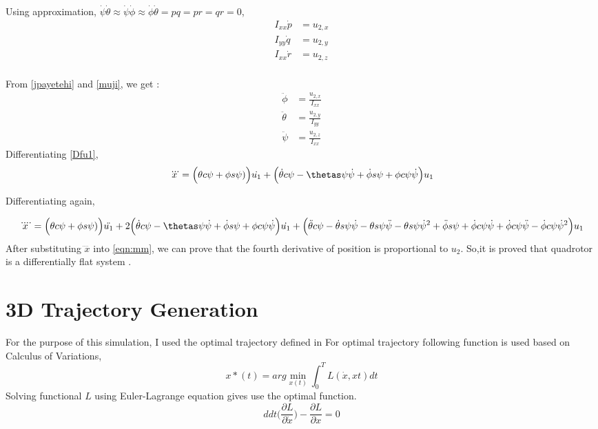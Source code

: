 \documentclass[conference,onecolumn,10pt]{IEEEtran}
\begin{document}
Using approximation, $\dot{\psi} \dot{\theta} \approx \dot{\psi}\dot{\phi} \approx \dot{\phi} \dot{\theta} = pq = pr = qr = 0   $,
\begin{equation}
\label{eqn:mm}
\begin{aligned}
I_{xx}\dot{p} & = u_{2,x}  \\ 
I_{yy}\dot{q} & = u_{2,y}  \\
I_{xx}\dot{r} & = u_{2,z} \\
\end{aligned}
\end{equation}

From \eqref{jpayetehi} and \eqref{muji}, we get : 
\begin{equation}
\label{muji}
\begin{aligned}
\ddot{\phi} & = \frac{u_{2,x}}{I_{xx}} \\ 
\ddot{\theta} &= \frac{u_{2,y}}{I_{yy}}  \\
\ddot{\psi} & = \frac{u_{2,z}}{ I_{xx}}
\end{aligned}
\end{equation}
Differentiating \eqref{Dfu1}, 
\begin{equation}
\label{lamo}
\dddot{x} = \Big(\theta c \psi + \phi s \psi)\Big)\dot{u_1}+ \Big(\dot{\theta} c \psi -\thetas\psi \dot{\psi} + \dot{\phi} s \psi + \phi c \psi \dot{\psi}\Big){u_1}
\end{equation}

Differentiating again,

 \begin{equation}
\label{lamo}
\ddddot{x} = \Big(\theta c \psi + \phi s \psi)\Big)\ddot{u_1}+ 2\Big(\dot{\theta} c \psi -\thetas\psi \dot{\psi} + \dot{\phi} s \psi + \phi c \psi \dot{\psi}\Big)\dot{u_1} + \\
\Big(\ddot{\theta}c\psi -\dot{\theta}s \psi \dot{\psi} - \theta s \psi \ddot{\psi}  - \theta s \psi \dot{\psi}^2 + \ddot{\phi}s \psi + \dot{\phi} c \psi \dot{\psi} +  \dot{\phi} c \psi \ddot{\psi} - \dot{\phi} c \psi \dot{\psi}^2 \Big)u_1
\end{equation}
%
After substituting $\ddddot{x}$ into \eqref{eqn:mm}, we can prove that the fourth derivative of position is proportional to $u_2$. So,it is proved that quadrotor is a differentially flat system \cite{mellinger2011minimum} \cite{AerialRobotics}. 

\section{3D Trajectory Generation} 
For the purpose of this simulation, I used the optimal trajectory defined in  \cite{mellinger2011minimum} 
For optimal trajectory following function is used based on Calculus of Variations, 
\begin{equation}
\label{opt}
x*(t) = arg \min_{x(t)} \int_0^TL(\dot{x},xt)dt
\end{equation}
Solving functional $L$ using Euler-Lagrange equation gives use the optimal function. 
\begin{equation}
{d}{dt}\Big(\frac{\partial L}{\partial \dot{x}}\Big) - \frac{\partial L}{\partial {x}} = 0 
\end{equation}
\end{document}
